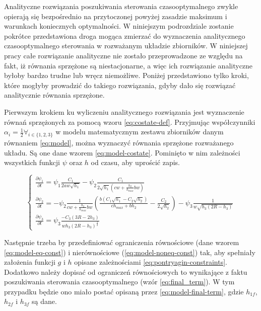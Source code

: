 Analityczne rozwiązania poszukiwania sterowania czasooptymalnego zwykle opierają się bezpośrednio na przytoczonej powyżej zasadzie maksimum i warunkach koniecznych optymalności. W niniejszym podrozdziale zostanie pokrótce przedstawiona droga mogąca zmierzać do wyznaczenia analitycznego czasooptymalnego sterowania w rozważanym układzie zbiorników. W niniejszej pracy całe rozwiązanie analityczne nie zostało przeprowadzone ze względu na fakt, iż równania sprzężone są niestacjonarne, a więc ich rozwiązanie analityczne byłoby bardzo trudne lub wręcz niemożliwe. Poniżej przedstawiono tylko kroki, które mogłyby prowadzić do takiego rozwiązania, gdyby dało się rozwiązać analitycznie równania sprzężone.

Pierwszym krokiem ku wyliczeniu analitycznego rozwiązania jest wyznaczenie równań sprzężonych za pomocą wzoru \ref{eq:costate-def}. Przyjmując współczynniki $\alpha_{i} = \frac{1}{2} \forall_{i \in \{1, 2, 3\}}$ w modelu matematycznym zestawu zbiorników danym równaniem \ref{eq:model}, można wyznaczyć równania sprzężone rozważanego układu. Są one dane wzorem \ref{eq:model-costate}. Pominięto w nim zależności wszystkich funkcji $\psi$ oraz $h$ od czasu, aby uprościć zapis.

\begin{equation}\label{eq:model-costate}
	\left \{
	\begin{array}{lr}
		\frac{\partial \psi_{1}}{\partial t} =  \psi_{1}\frac{C_{1}}{2aw\sqrt{h_{1}}} - \psi_{2}\frac{C_{1}}{2\sqrt{h_{1}}(cw + \frac{h_{2}}{h_{max}}bw)} \\[20pt]
		\frac{\partial \psi_{2}}{\partial t} = - \psi_{2}\frac{1}{cw + \frac{h_{2}}{h_{max}}bw}(\frac{b(C_{1}\sqrt{h_{1}} - C_{2}\sqrt{h_{2}})}{ch_{max} + bh_{2}} - \frac{C_{2}}{2\sqrt{h_{2}}}) - \psi_{3}\frac{1}{w\sqrt{h_{3}(2R - h_{3})}} \\[20pt]
		\frac{\partial \psi_{3}}{\partial t} = \psi_{3}\frac{-C_{3}(3R - 2h_{3})}{wh_{3}(2R - h_{3})^{\frac{3}{2}}}
	\end{array}
	\right.
\end{equation}

Następnie trzeba by przedefiniować ograniczenia równościowe (dane wzorem \ref{eq:model-eq-const}) i nierównościowe (\ref{eq:model-noneq-const}) tak, aby spełniały założenia funkcji $g$ i $h$ opisane zależnościami \ref{eq:pontryagin-constraints}.
Dodatkowo należy dopisać od ograniczeń równościowych to wynikające z faktu poszukiwania sterowania czasooptymalnego (wzór \ref{eq:final_term}). W tym przypadku będzie ono miało postać opisaną przez \ref{eq:model-final-term}, gdzie $h_{1f}$, $h_{2f}$ i $h_{3f}$ są dane.

